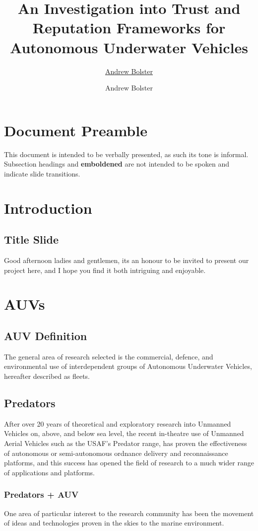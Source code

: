 \documentclass[oneside,11pt,a4paper]{Latex/Classes/PhDthesisPSnPDF}
\title{An Investigation into Trust and Reputation Frameworks for Autonomous Underwater Vehicles}
\author{\href{mailto:me@andrewbolster.info}{Andrew Bolster}}
\author{Andrew Bolster}
\begin{document}
\maketitle  %
\begin{doublespace}
\section{Document Preamble}
This document is intended to be verbally presented, as such its tone is
informal.
Subsection headings and \textbf{emboldened} are not intended to be spoken and
indicate slide transitions.
\section{Introduction}
\subsection{Title Slide} 
Good afternoon ladies and gentlemen, its an honour to be
invited to present our project here, and I hope you find it both intriguing and
enjoyable.

\section{AUVs}
\subsection{AUV Definition}
The general area of research selected is the
commercial, defence, and environmental use of interdependent groups of
Autonomous Underwater Vehicles, hereafter described as fleets.

\subsection{Predators} After over 20 years of theoretical and exploratory
research into Unmanned Vehicles on, above, and below sea level, the recent
in-theatre use of Unmanned Aerial Vehicles such as the USAF's Predator range,
has proven the effectiveness of autonomous or semi-autonomous ordnance delivery and reconnaissance platforms,
and this success has opened the field of research to a much wider range of
applications and platforms.

\subsubsection{Predators + AUV}  One area of particular interest to the research
community has been the movement of ideas and technologies proven in the skies to the
marine environment.


\end{doublespace}
\end{document}
